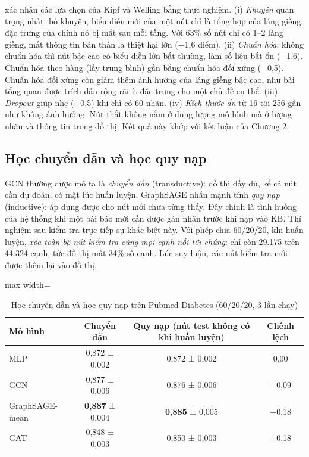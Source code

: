  xác nhận các lựa chọn của Kipf và Welling bằng thực nghiệm. (i) \emph{Khuyên} quan trọng nhất: bỏ khuyên, biểu diễn mới của một nút chỉ là tổng hợp của láng giềng, đặc trưng của chính nó bị mất sau mỗi tầng. Với 63\% số nút chỉ có 1–2 láng giềng, mất thông tin bản thân là thiệt hại lớn (−1,6 điểm). (ii) \emph{Chuẩn hóa}: không chuẩn hóa thì nút bậc cao có biểu diễn lớn bất thường, làm số liệu bất ổn (−1,6). Chuẩn hóa theo hàng (lấy trung bình) gần bằng chuẩn hóa đối xứng (−0,5). Chuẩn hóa đối xứng còn giảm thêm ảnh hưởng của láng giềng bậc cao, như bài tổng quan được trích dẫn rộng rãi ít đặc trưng cho một chủ đề cụ thể. (iii) \emph{Dropout} giúp nhẹ (+0,5) khi chỉ có 60 nhãn. (iv) \emph{Kích thước ẩn} từ 16 tới 256 gần như không ảnh hưởng. Nút thắt không nằm ở dung lượng mô hình mà ở lượng nhãn và thông tin trong đồ thị. Kết quả này khớp với kết luận của Chương 2.

\subsection{Học chuyển dẫn và học quy nạp}

GCN thường được mô tả là \emph{chuyển dẫn} (transductive): đồ thị đầy đủ, kể cả nút cần dự đoán, có mặt lúc huấn luyện. GraphSAGE nhấn mạnh tính \emph{quy nạp} (inductive): áp dụng được cho nút mới chưa từng thấy. Đây chính là tình huống của hệ thống khi một bài báo mới cần được gán nhãn trước khi nạp vào KB. Thí nghiệm sau kiểm tra trực tiếp sự khác biệt này. Với phép chia 60/20/20, khi huấn luyện, \emph{xóa toàn bộ nút kiểm tra cùng mọi cạnh nối tới chúng}: chỉ còn 29.175 trên 44.324 cạnh, tức đồ thị mất 34\% số cạnh. Lúc suy luận, các nút kiểm tra mới được thêm lại vào đồ thị.

\begin{table}[H]
\centering
\caption{Học chuyển dẫn và học quy nạp trên Pubmed-Diabetes (60/20/20, 3 lần chạy)}
\label{tab:ch6-inductive}
\small
\begin{adjustbox}{max width=\linewidth}
\begin{tabular}{@{}lccc@{}}
\toprule
\textbf{Mô hình} & \textbf{Chuyển dẫn} & \textbf{Quy nạp (nút test không có khi huấn luyện)} & \textbf{Chênh lệch} \\
\midrule
MLP & 0,872 ± 0,002 & 0,872 ± 0,002 & 0,00 \\
GCN & 0,877 ± 0,006 & 0,876 ± 0,006 & −0,09 \\
GraphSAGE-mean & \textbf{0,887} ± 0,004 & \textbf{0,885} ± 0,005 & −0,18 \\
GAT & 0,848 ± 0,003 & 0,850 ± 0,003 & +0,18 \\
\bottomrule
\end{tabular}
\end{adjustbox}
\end{table}

